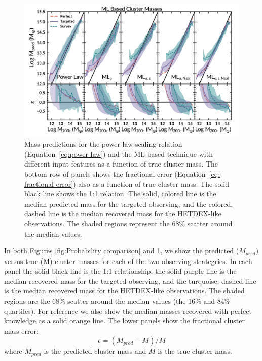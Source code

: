 \documentclass[fleqn,usenatbib]{mnras}
\begin{document}
\begin{figure} 
	\includegraphics[width=\textwidth]{figures/MLcomparison.pdf} 
	\caption{Mass predictions for the power law scaling relation (Equation~\ref{eq:power law}) and the ML based technique with different input features as a function of true cluster mass. The bottom row of panels shows the fractional error (Equation~\ref{eq: fractional error}) also as a function of true cluster mass. The solid black line shows the 1:1 relation. The solid, colored line is the median predicted mass for the targeted observing, and the colored, dashed line is the median recovered mass for the HETDEX-like observations. The shaded regions represent the 68\% scatter around the median values.} \label{fig: ML comparison} 
\end{figure}

In both Figures \ref{fig:Probability comparison} and \ref{fig: ML comparison}, we show the predicted ($M_{pred}$) versus true (M) cluster masses for each of the two observing strategries. In each panel the solid black line is the 1:1 relationship, the solid purple line is the median recovered mass for the targeted observing, and the turquoise, dashed line is the median recovered mass for the HETDEX-like observations. The shaded regions are the 68\% scatter around the median values (the 16\% and 84\% quartiles). For reference we also show the median masses recovered with perfect knowledge as a solid orange line. The lower panels show the fractional cluster mass error: 
\begin{equation}\label{eq: fractional error}
	\epsilon = (M_{pred} - M)/M
\end{equation}
where $M_{pred}$ is the predicted cluster mass and $M$ is the true cluster mass.
\end{document}

